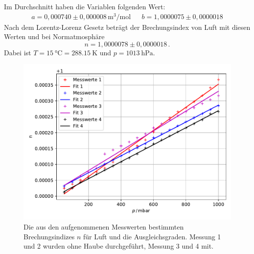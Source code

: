 \noindent
Im Durchschnitt haben die Variablen folgenden Wert:
\begin{align*}
  a = 0,000740 \pm 0,000008 \, \si{\cubic\metre\per\mole}& &b = 1,0000075 \pm 0,0000018
\end{align*}
Nach dem Lorentz-Lorenz Gesetz beträgt der Brechungsindex von Luft mit diesen Werten und bei Normatmosphäre 
\begin{equation*}
  n = 1,0000078 \pm 0,0000018 \, .
\end{equation*}
Dabei ist $T = \SI{15}{\celsius} = \SI{288.15}{\kelvin}$ und $p = \SI{1013}{\hecto\pascal}$.

\begin{figure}[H]
  \centering
  \includegraphics[width=\textwidth]{build/lorentz_lorenz.pdf}
  \caption{Die aus den aufgenommenen Messwerten bestimmten Brechungsindizes $n$ für Luft und die Ausgleichsgraden.
  Messung 1 und 2 wurden ohne Haube durchgeführt, Messung 3 und 4 mit.}
  \label{fig:lorentz_lorenz}
\end{figure}

